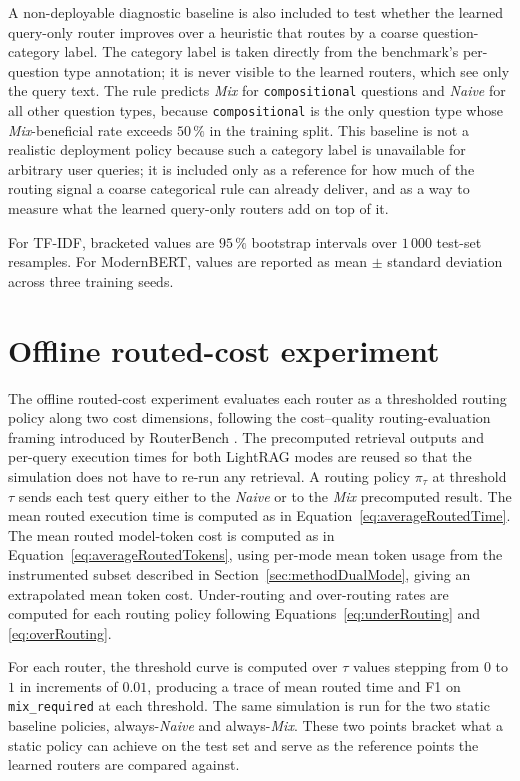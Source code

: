 \documentclass[english, bibtex]{kththesis}               %
\numberwithin{listing}{chapter}
\begin{document}
A non-deployable diagnostic baseline is also included to test whether the learned query-only router improves over a heuristic that routes by a coarse question-category label. The category label is taken directly from the benchmark's per-question type annotation; it is never visible to the learned routers, which see only the query text. The rule predicts \emph{Mix} for \texttt{compositional} questions and \emph{Naive} for all other question types, because \texttt{compositional} is the only question type whose \emph{Mix}-beneficial rate exceeds $50\,\%$ in the training split. This baseline is not a realistic deployment policy because such a category label is unavailable for arbitrary user queries; it is included only as a reference for how much of the routing signal a coarse categorical rule can already deliver, and as a way to measure what the learned query-only routers add on top of it.

For TF-IDF, bracketed values are $95\,\%$ bootstrap intervals \cite{efron1979bootstrap} over $1\,000$ test-set resamples. For ModernBERT, values are reported as mean $\pm$ standard deviation across three training seeds.

\section{Offline routed-cost experiment}
\label{sec:implPolicy}

The offline routed-cost experiment evaluates each router as a thresholded routing policy along two cost dimensions, following the cost--quality routing-evaluation framing introduced by RouterBench \cite{hu2024routerbench}. The precomputed retrieval outputs and per-query execution times for both LightRAG modes are reused so that the simulation does not have to re-run any retrieval. A routing policy $\pi_{\tau}$ at threshold $\tau$ sends each test query either to the \emph{Naive} or to the \emph{Mix} precomputed result. The mean routed execution time is computed as in Equation~\ref{eq:averageRoutedTime}. The mean routed model-token cost is computed as in Equation~\ref{eq:averageRoutedTokens}, using per-mode mean token usage from the instrumented subset described in Section~\ref{sec:methodDualMode}, giving an extrapolated mean token cost. Under-routing and over-routing rates are computed for each routing policy following Equations~\ref{eq:underRouting} and \ref{eq:overRouting}.

For each router, the threshold curve is computed over $\tau$ values stepping from $0$ to $1$ in increments of $0.01$, producing a trace of mean routed time and F1 on \texttt{mix\_required} at each threshold. The same simulation is run for the two static baseline policies, always-\emph{Naive} and always-\emph{Mix}. These two points bracket what a static policy can achieve on the test set and serve as the reference points the learned routers are compared against.
\end{document}
